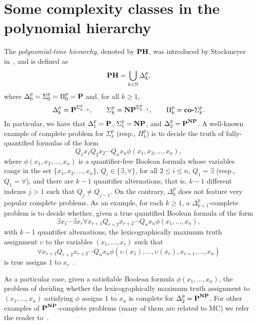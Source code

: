 \section{Some complexity classes in the polynomial hierarchy}\label{sub:compl}

The \emph{polynomial-time hierarchy}, denoted by $\textbf{PH}$, was introduced by Stockmeyer in~\cite{stockmeyer1976}, and is defined as \[\textbf{PH}=\bigcup_{k\in\mathbb{N}}\Delta^p_k, \] 
%
where $\Delta_0^p=\Sigma_0^p=\Pi_0^p=\textbf{P}$
and, for all $k\geq 1$, 
\[
\Delta_k^p=\textbf{P}^{\Sigma_{k-1}^p},
\qquad 
\Sigma_k^p=\textbf{NP}^{\Sigma_{k-1}^p},
\qquad 
\Pi_k^p=\textbf{co-}\Sigma_k^p.
\]
%
In particular, we have that $\Delta_1^p=\textbf{P}$, $\Sigma_1^p=\textbf{NP}$, and $\Delta_2^p=\textbf{P}^{\textbf{NP}}$. A well-known example of complete problem for $\Sigma^p_k$ (resp., $\Pi^p_k$) is to decide the truth of fully-quantified formulas of the form 
\[Q_1 x_1 Q_2 x_2\cdots Q_n x_n \phi(x_1,x_2,\ldots ,x_n),\] where $\phi(x_1,x_2,\ldots ,x_n)$ is a quantifier-free Boolean formula whose variables range in the set $\{x_1,x_2,\ldots ,x_n\}$, $Q_i\in\{\exists,\forall\}$, for all $2\leq i \leq n$, $Q_1=\exists$ (resp., $Q_1=\forall$), and there are $k-1$ quantifier alternations, that is, $k-1$ different indexes $j>1$ such that $Q_j\neq Q_{j-1}$.
%
On the contrary, $\Delta_k^p$ does not feature very popular complete problems. As an example, for each $k\geq 1$, a $\Delta_{k+1}^p$-complete problem is to decide whether, given a true quantified Boolean formula of the form 
\begin{equation*}
\exists x_1\cdots \exists x_r \forall x_{r+1} Q_{r+2} x_{r+2}\cdots Q_n x_n \phi(x_1,\ldots ,x_n),
\end{equation*}
with $k-1$ quantifier alternations, the lexicographically maximum truth assignment $\upsilon$ to the variables $(x_1,\ldots , x_r)$ such that 
\begin{equation*}
\forall x_{r+1} Q_{r+2} x_{r+2}\cdots Q_n x_n \phi(\upsilon (x_1),\ldots , \upsilon (x_r), x_{r+1}, \ldots , x_n)
\end{equation*}
is true assigns $1$ to $x_r$~\cite{gottlob1995}.

As a particular case, given a satisfiable Boolean formula $\phi(x_1,\ldots , x_n)$, the problem of deciding whether the lexicographically maximum truth assignment to $(x_1,\ldots , x_n)$ satisfying $\phi$ assigns $1$ to $x_n$ is complete for $\Delta_2^p=\textbf{P}^{\textbf{NP}}$.
For other examples of $\textbf{P}^{\textbf{NP}}$-complete problems (many of them are related to MC) we refer the reader to~\cite{batzold2009,LMS01,LMS02,Lmp10}.

